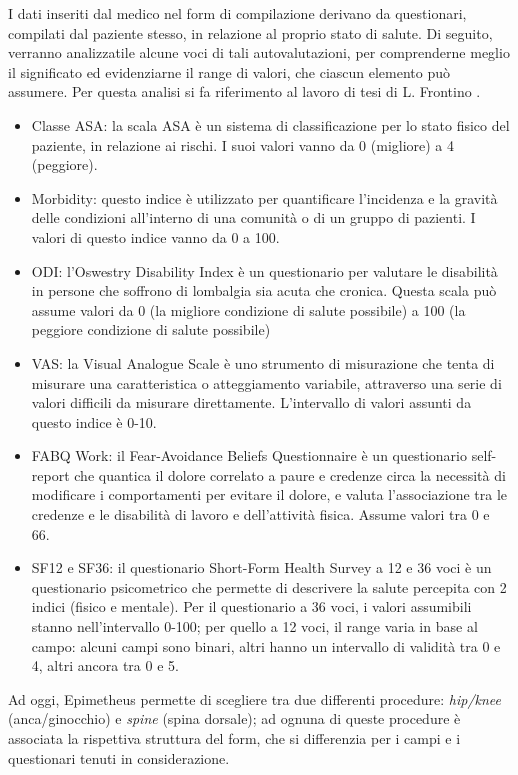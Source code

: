 I dati inseriti dal medico nel form di compilazione derivano da questionari, compilati dal paziente stesso, in relazione al proprio stato di salute. 
\newline
Di seguito, verranno analizzatile alcune voci di tali autovalutazioni, per comprenderne meglio il significato ed evidenziarne il range di valori, che ciascun elemento può assumere.
\newline
Per questa analisi si fa riferimento al lavoro di tesi di L. Frontino \cite{tesiFrontino}.
\begin{itemize}
    \item Classe ASA: la scala ASA è un sistema di classificazione per lo stato fisico del paziente, in relazione ai rischi. I suoi valori vanno da 0 (migliore) a 4 (peggiore).
    \item Morbidity: questo indice è utilizzato per quantificare l'incidenza e la gravità delle condizioni all'interno di una comunità o di un gruppo di pazienti. I valori di questo indice vanno da 0 a 100.
    \item ODI: l'Oswestry Disability Index è un questionario per valutare le disabilità in persone che soffrono di lombalgia sia acuta che cronica. Questa scala può assume valori da 0 (la migliore condizione di salute possibile) a 100 (la peggiore condizione di salute possibile)
    \item VAS: la Visual Analogue Scale è uno strumento di misurazione che tenta di misurare una caratteristica o atteggiamento variabile, attraverso una serie di valori difficili da misurare direttamente. L'intervallo di valori assunti da questo indice è 0-10.
    \item FABQ Work: il Fear-Avoidance Beliefs Questionnaire è un questionario self-report che quantica il dolore correlato a paure e credenze circa la necessità di modificare i comportamenti per evitare il dolore, e valuta l'associazione tra le credenze e le disabilità di lavoro e dell'attività fisica. Assume valori tra 0 e 66.
    \item SF12 e SF36: il questionario Short-Form Health Survey a 12 e 36 voci è un questionario psicometrico che permette di descrivere la salute percepita con 2 indici (fisico e mentale). Per il questionario a 36 voci, i valori assumibili stanno nell'intervallo 0-100; per quello a 12 voci, il range varia in base al campo: alcuni campi sono binari, altri hanno un intervallo di validità tra 0 e 4, altri ancora tra 0 e 5.

\end{itemize}
Ad oggi, Epimetheus permette di scegliere tra due differenti procedure: \textit{hip/knee} (anca/ginocchio) e \textit{spine} (spina dorsale); ad ognuna di queste procedure è associata la rispettiva struttura del form, che si differenzia per i campi e i questionari tenuti in considerazione.


